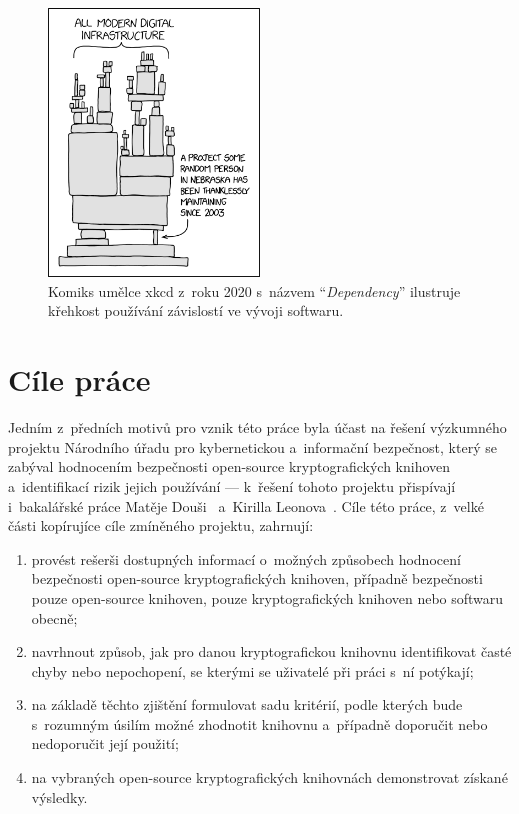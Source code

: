 \begin{figure}
    \centering
    \includegraphics[width=0.5\textwidth]{text/media/dependency.png}
    \caption[~Komiks umělce xkcd s~názvem ``\textit{Dependency}'']{Komiks umělce xkcd z~roku 2020 s~názvem ``\textit{Dependency}'' ilustruje křehkost používání závislostí ve vývoji softwaru.~\cite{xkcd}}
\end{figure}

\section*{Cíle práce}

Jedním z~předních motivů pro vznik této práce byla účast na řešení výzkumného projektu Národního úřadu pro kybernetickou a~informační bezpečnost, který se zabýval hodnocením bezpečnosti open-source kryptografických knihoven a~identifikací rizik jejich používání --- k~řešení tohoto projektu přispívají i~bakalářské práce Matěje Douši~\cite{matej} a~Kirilla Leonova~\cite{kirill}. Cíle této práce, z~velké části kopírujíce cíle zmíněného projektu, zahrnují:

\begin{enumerate}
    
    \item provést rešerši dostupných informací o~možných způsobech hodnocení bezpečnosti open-source kryptografických knihoven, případně bezpečnosti pouze open-source knihoven, pouze kryptografických knihoven nebo softwaru obecně;

    \item navrhnout způsob, jak pro danou kryptografickou knihovnu identifikovat časté chyby nebo nepochopení, se kterými se uživatelé při práci s~ní potýkají;

    \item na základě těchto zjištění formulovat sadu kritérií, podle kterých bude s~rozumným úsilím možné zhodnotit knihovnu a~případně doporučit nebo nedoporučit její použití;

    \item na vybraných open-source kryptografických knihovnách demonstrovat získané výsledky.
    
\end{enumerate}

